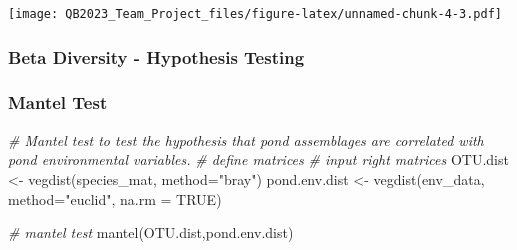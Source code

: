 \documentclass[
]{article}
\newenvironment{Shaded}{\begin{snugshade}}{\end{snugshade}}
\newcommand{\AttributeTok}[1]{\textcolor[rgb]{0.77,0.63,0.00}{#1}}
\newcommand{\CommentTok}[1]{\textcolor[rgb]{0.56,0.35,0.01}{\textit{#1}}}
\newcommand{\ConstantTok}[1]{\textcolor[rgb]{0.00,0.00,0.00}{#1}}
\newcommand{\DecValTok}[1]{\textcolor[rgb]{0.00,0.00,0.81}{#1}}
\newcommand{\FunctionTok}[1]{\textcolor[rgb]{0.00,0.00,0.00}{#1}}
\newcommand{\NormalTok}[1]{#1}
\newcommand{\OtherTok}[1]{\textcolor[rgb]{0.56,0.35,0.01}{#1}}
\newcommand{\SpecialCharTok}[1]{\textcolor[rgb]{0.00,0.00,0.00}{#1}}
\newcommand{\StringTok}[1]{\textcolor[rgb]{0.31,0.60,0.02}{#1}}
\begin{document}
\begin{Shaded}
\end{Shaded}

\texttt{[image: QB2023\_Team\_Project\_files/figure-latex/unnamed-chunk-4-3.pdf]}

\hypertarget{beta-diversity---hypothesis-testing}{%
\subsubsection{Beta Diversity - Hypothesis
Testing}\label{beta-diversity---hypothesis-testing}}

\hypertarget{mantel-test}{%
\subsubsection{Mantel Test}\label{mantel-test}}

\begin{Shaded}
\begin{Highlighting}[]
\CommentTok{\# Mantel test to test the hypothesis that pond assemblages are correlated with pond environmental variables.}
\CommentTok{\# define matrices}
\CommentTok{\# input right matrices }
\NormalTok{OTU.dist }\OtherTok{\textless{}{-}} \FunctionTok{vegdist}\NormalTok{(species\_mat, }\AttributeTok{method=}\StringTok{"bray"}\NormalTok{)}
\NormalTok{pond.env.dist }\OtherTok{\textless{}{-}} \FunctionTok{vegdist}\NormalTok{(env\_data, }\AttributeTok{method=}\StringTok{"euclid"}\NormalTok{, }\AttributeTok{na.rm =} \ConstantTok{TRUE}\NormalTok{)}

\CommentTok{\# mantel test}
\FunctionTok{mantel}\NormalTok{(OTU.dist,pond.env.dist)}
\end{Highlighting}
\end{Shaded}
\end{document}

